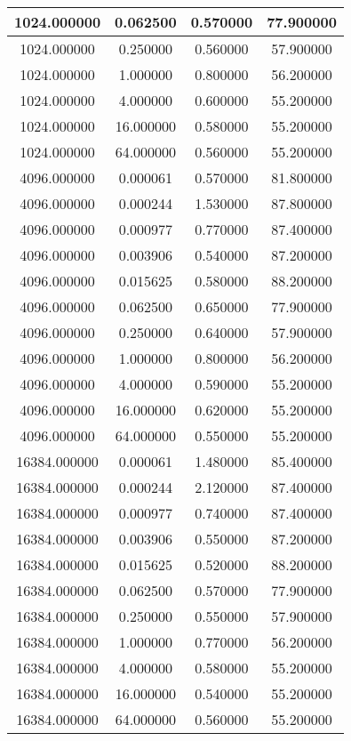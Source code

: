 \documentclass[12pt]{article}
\begin{document}
\begin{enumerate}[label=\alph*.]
\begin{longtable}{| c | c | c | c |}
		\hline
		1024.000000 & 0.062500 & 0.570000 & 77.900000 \\
		\hline
		1024.000000 & 0.250000 & 0.560000 & 57.900000 \\
		\hline
		1024.000000 & 1.000000 & 0.800000 & 56.200000 \\
		\hline
		1024.000000 & 4.000000 & 0.600000 & 55.200000 \\
		\hline
		1024.000000 & 16.000000 & 0.580000 & 55.200000 \\
		\hline
		1024.000000 & 64.000000 & 0.560000 & 55.200000 \\
		\hline
		4096.000000 & 0.000061 & 0.570000 & 81.800000 \\
		\hline
		4096.000000 & 0.000244 & 1.530000 & 87.800000 \\
		\hline
		4096.000000 & 0.000977 & 0.770000 & 87.400000 \\
		\hline
		4096.000000 & 0.003906 & 0.540000 & 87.200000 \\
		\hline
		4096.000000 & 0.015625 & 0.580000 & 88.200000 \\
		\hline
		4096.000000 & 0.062500 & 0.650000 & 77.900000 \\
		\hline
		4096.000000 & 0.250000 & 0.640000 & 57.900000 \\
		\hline
		4096.000000 & 1.000000 & 0.800000 & 56.200000 \\
		\hline
		4096.000000 & 4.000000 & 0.590000 & 55.200000 \\
		\hline
		4096.000000 & 16.000000 & 0.620000 & 55.200000 \\
		\hline
		4096.000000 & 64.000000 & 0.550000 & 55.200000 \\
		\hline
		16384.000000 & 0.000061 & 1.480000 & 85.400000 \\
		\hline
		16384.000000 & 0.000244 & 2.120000 & 87.400000 \\
		\hline
		16384.000000 & 0.000977 & 0.740000 & 87.400000 \\
		\hline
		16384.000000 & 0.003906 & 0.550000 & 87.200000 \\
		\hline
		16384.000000 & 0.015625 & 0.520000 & 88.200000 \\
		\hline
		16384.000000 & 0.062500 & 0.570000 & 77.900000 \\
		\hline
		16384.000000 & 0.250000 & 0.550000 & 57.900000 \\
		\hline
		16384.000000 & 1.000000 & 0.770000 & 56.200000 \\
		\hline
		16384.000000 & 4.000000 & 0.580000 & 55.200000 \\
		\hline
		16384.000000 & 16.000000 & 0.540000 & 55.200000 \\
		\hline
		16384.000000 & 64.000000 & 0.560000 & 55.200000 \\
		\hline
	    \end{longtable}



\end{enumerate}
\end{document}
